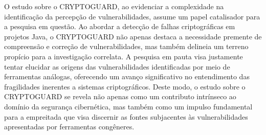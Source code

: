 O estudo sobre o CRYPTOGUARD, ao evidenciar a complexidade na identificação da percepção de vulnerabilidades, assume um papel catalisador para a pesquisa em questão. Ao abordar a detecção de falhas criptográficas em projetos Java, o CRYPTOGUARD não apenas destaca a necessidade premente de compreensão e correção de vulnerabilidades, mas também delineia um terreno propício para a investigação correlata. A pesquisa em pauta visa justamente tentar elucidar as origens das vulnerabilidades identificadas por meio de ferramentas análogas, oferecendo um avanço significativo no entendimento das fragilidades inerentes a sistemas criptográficos. Deste modo, o estudo sobre o CRYPTOGUARD se revela não apenas como um contributo intrínseco ao domínio da segurança cibernética, mas também como um impulso fundamental para a empreitada que visa discernir as fontes subjacentes às vulnerabilidades apresentadas por ferramentas congêneres.








